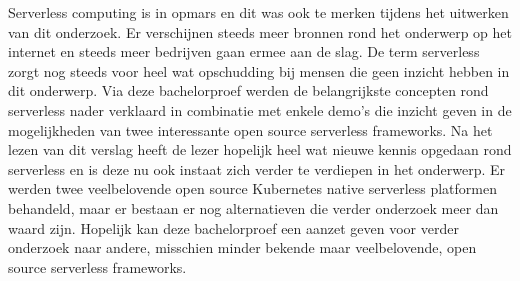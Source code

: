 Serverless computing is in opmars en dit was ook te merken tijdens het uitwerken van dit onderzoek. Er verschijnen steeds meer bronnen rond het onderwerp op het internet en steeds meer bedrijven gaan ermee aan de slag. De term serverless zorgt nog steeds voor heel wat opschudding bij mensen die geen inzicht hebben in dit onderwerp. Via deze bachelorproef werden de belangrijkste concepten rond serverless nader verklaard in combinatie met enkele demo's die inzicht geven in de mogelijkheden van twee interessante open source serverless frameworks. Na het lezen van dit verslag heeft de lezer hopelijk heel wat nieuwe kennis opgedaan rond serverless en is deze nu ook instaat zich verder te verdiepen in het onderwerp. Er werden twee veelbelovende open source Kubernetes native serverless platformen behandeld, maar er bestaan er nog alternatieven die verder onderzoek meer dan waard zijn. Hopelijk kan deze bachelorproef een aanzet geven voor verder onderzoek naar andere, misschien minder bekende maar veelbelovende, open source serverless frameworks.